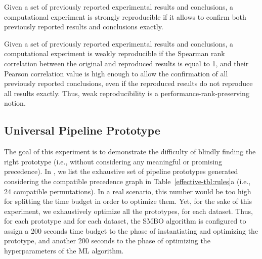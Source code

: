 \begin{definition}
    \label{def:strong}
    Given a set of previously reported experimental results and conclusions, a computational experiment is strongly reproducible if it allows to confirm both previously reported results and conclusions exactly.
\end{definition}

\begin{definition}
    \label{def:weak}
    Given a set of previously reported experimental results and conclusions, a computational experiment is weakly reproducible if the Spearman rank correlation between the original and reproduced results is equal to 1, and their Pearson correlation value is high enough to allow the confirmation of all previously reported conclusions, even if the reproduced results do not reproduce all results exactly. Thus, weak reproducibility is a performance-rank-preserving notion.
\end{definition}

\subsection{Universal Pipeline Prototype}
\label{effective-sec:eval-universal-pipeline}
The goal of this experiment is to demonstrate the difficulty of blindly finding the right prototype (i.e., without considering any meaningful or promising precedence).
In , we list the exhaustive set of pipeline prototypes generated considering the compatible precedence graph in Table~\ref{effective-tbl:rules}a (i.e., 24 compatible permutations).
In a real scenario, this number would be too high for splitting the time budget in order to optimize them.
Yet, for the sake of this experiment, we exhaustively optimize all the prototypes, for each dataset.
Thus, for each prototype and for each dataset, the SMBO algorithm is configured to assign a 200 seconds time budget to the phase of instantiating and optimizing the prototype, and another 200 seconds to the phase of optimizing the hyperparameters of the ML algorithm.

